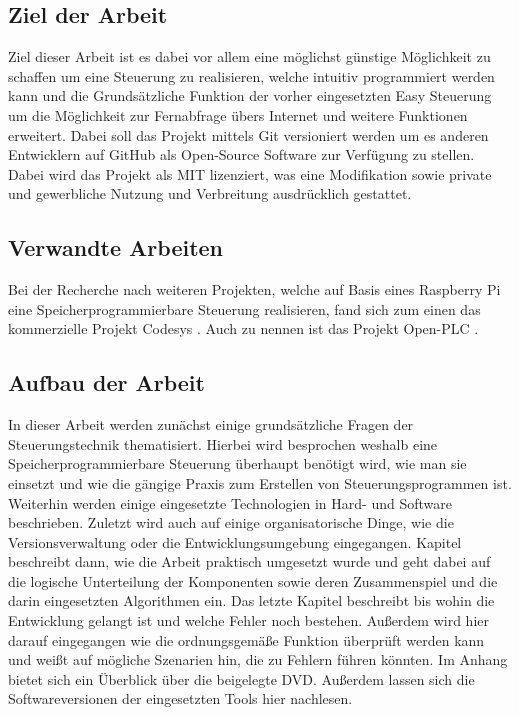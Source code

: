 \subsection{Ziel der Arbeit}
Ziel dieser Arbeit ist es dabei vor allem eine möglichst günstige Möglichkeit zu schaffen um eine Steuerung zu realisieren, welche intuitiv programmiert werden kann und die Grundsätzliche Funktion der vorher eingesetzten Easy Steuerung um die Möglichkeit zur Fernabfrage übers Internet und weitere Funktionen erweitert. Dabei soll das Projekt mittels Git \cite{BOOK:GIT} versioniert werden um es anderen Entwicklern auf GitHub als Open-Source Software zur Verfügung zu stellen. Dabei wird das Projekt als MIT lizenziert, was eine Modifikation sowie private und gewerbliche Nutzung und Verbreitung ausdrücklich gestattet. 
\subsection{Verwandte Arbeiten}
Bei der Recherche nach weiteren Projekten, welche auf Basis eines Raspberry Pi eine Speicherprogrammierbare Steuerung realisieren, fand sich zum einen das kommerzielle Projekt Codesys \cite{URL:Codesys}. Auch zu nennen ist das Projekt Open-PLC \cite{URL:OpenPLC}. 
\subsection{Aufbau der Arbeit}
In dieser Arbeit werden zunächst einige grundsätzliche Fragen der Steuerungstechnik thematisiert. Hierbei wird besprochen weshalb eine Speicherprogrammierbare Steuerung überhaupt benötigt wird, wie man sie einsetzt und wie die gängige Praxis zum Erstellen von Steuerungsprogrammen ist. Weiterhin werden einige eingesetzte Technologien in Hard- und Software beschrieben. Zuletzt wird auch auf einige organisatorische Dinge, wie die Versionsverwaltung oder die Entwicklungsumgebung eingegangen. Kapitel  beschreibt dann, wie die Arbeit praktisch umgesetzt wurde und geht dabei auf die logische Unterteilung der Komponenten sowie deren Zusammenspiel und die darin eingesetzten Algorithmen ein. Das letzte Kapitel beschreibt bis wohin die Entwicklung gelangt ist und welche Fehler noch bestehen. Außerdem wird hier darauf eingegangen wie die ordnungsgemäße Funktion überprüft werden kann und weißt auf mögliche Szenarien hin, die zu Fehlern führen könnten. Im Anhang bietet sich ein Überblick über die beigelegte DVD. Außerdem lassen sich die Softwareversionen der eingesetzten Tools hier nachlesen.

\clearpage
